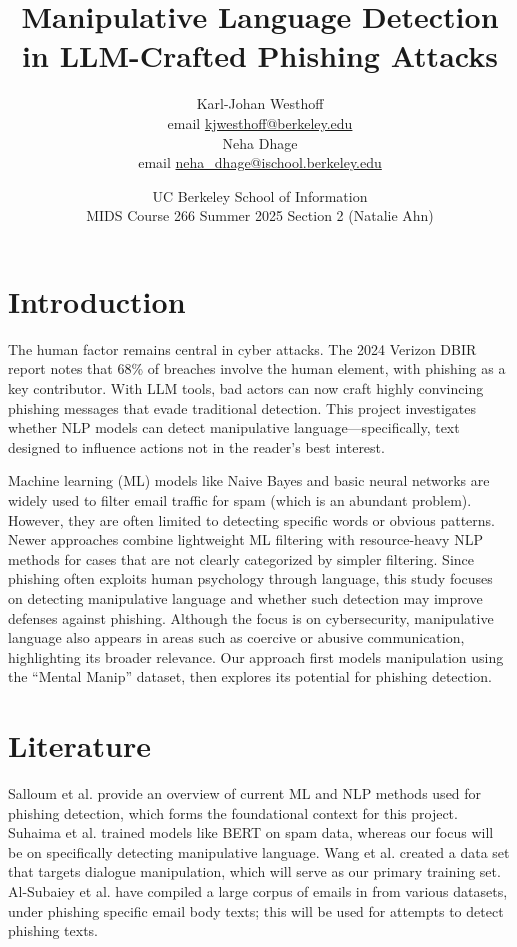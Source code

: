 \documentclass[
	letterpaper, %
	12pt, %
	unnumberedsections, %
	twoside, %
]{LTJournalArticle}
\title{Manipulative Language Detection in LLM-Crafted
Phishing Attacks
}  %
\author{
	Karl-Johan Westhoff \\
	email \href{mailto:kjwesthoff@berkeley.edu}{kjwesthoff@berkeley.edu} \\
    Neha Dhage \\
	email \href{mailto:neha_dhage@ischool.berkeley.edu}{neha\_dhage@ischool.berkeley.edu}
}
\date{UC Berkeley School of Information \\
MIDS Course 266 Summer 2025 Section 2 (Natalie Ahn) \\
}
\begin{document}
\maketitle %
\section{Introduction}
The human factor remains central in cyber attacks. The 2024 Verizon DBIR report \cite{verizon2024dbir} notes that 68\% of breaches involve the human element, with phishing as a key contributor. With LLM tools, bad actors can now craft highly convincing phishing messages that evade traditional detection.
This project investigates whether NLP models can detect manipulative language—specifically, text designed to influence actions not in the reader's best interest.

Machine learning (ML) models like Naive Bayes and basic neural networks are widely used to filter email traffic for spam (which is an abundant problem). However, they are often limited to detecting specific words or obvious patterns. Newer approaches combine lightweight ML filtering with resource-heavy NLP methods for cases that are not clearly categorized by simpler filtering. Since phishing often exploits human psychology through language, this study focuses on detecting manipulative language and whether such detection may improve defenses against phishing. Although the focus is on cybersecurity, manipulative language also appears in areas such as coercive or abusive communication, highlighting its broader relevance. Our approach first models manipulation using the “Mental Manip” dataset, then explores its potential for phishing detection.

\section{Literature}
Salloum et al. \cite{SALLOUM202119} provide an overview of current ML and NLP methods used for phishing detection, which forms the foundational context for this project.
Suhaima et al. \cite{ImprovedPhishing} trained models like BERT on spam data, whereas our focus will be on specifically detecting manipulative language.
Wang et al. \cite{MentalManip} created a data set that targets dialogue manipulation, which will serve as our primary training set.
Al-Subaiey et al. have compiled a large corpus of emails in \cite{PhishingEmailDataset} from various datasets, under phishing specific email body texts; this will be used for attempts to detect phishing texts.
\end{document}
